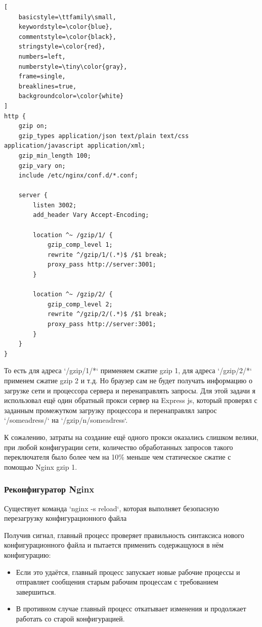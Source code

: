\documentclass[12pt]{article}
\begin{document}
\begin{lstlisting}[
    basicstyle=\ttfamily\small,
    keywordstyle=\color{blue},
    commentstyle=\color{black},
    stringstyle=\color{red},
    numbers=left,
    numberstyle=\tiny\color{gray},
    frame=single,
    breaklines=true,
    backgroundcolor=\color{white}
]
http {
    gzip on;
    gzip_types application/json text/plain text/css application/javascript application/xml;
    gzip_min_length 100;
    gzip_vary on;
    include /etc/nginx/conf.d/*.conf;

    server {
        listen 3002;
        add_header Vary Accept-Encoding;

        location ^~ /gzip/1/ {
            gzip_comp_level 1;
            rewrite ^/gzip/1/(.*)$ /$1 break;
            proxy_pass http://server:3001;
        }

        location ^~ /gzip/2/ {
            gzip_comp_level 2;
            rewrite ^/gzip/2/(.*)$ /$1 break;
            proxy_pass http://server:3001;
        }
    }
}
\end{lstlisting}

То есть для адреса `/gzip/1/*` применяем сжатие gzip 1, для адреса `/gzip/2/*` применем сжатие gzip 2 и т.д. Но браузер сам не будет получать информацию о загрузке сети и процессора сервера и перенаправлять запросы. Для этой задачи я использовал ещё один обратный прокси сервер на Express js, который проверял с заданным промежутком загрузку процессора и перенаправлял запрос `/someadress/` на `/gzip/n/someadress`.

К сожалению, затраты на создание ещё одного прокси оказались слишком велики, при любой конфигурации сети, количество обработанных запросов такого переключателя было более чем на 10\% меньше чем статическое сжатие с помощью Nginx gzip 1.

\subsubsection{Реконфигуратор Nginx }

Существует команда `nginx -s reload`, которая выполняет безопасную перезагрузку конфигурационного файла

Получив сигнал, главный процесс проверяет правильность синтаксиса нового конфигурационного файла и пытается применить содержащуюся в нём конфигурацию:
\begin{itemize}
    \item Если это удаётся, главный процесс запускает новые рабочие процессы и отправляет сообщения старым рабочим процессам с требованием завершиться.
    \item В противном случае главный процесс откатывает изменения и продолжает работать со старой конфигурацией.
\end{itemize}
\end{document}
